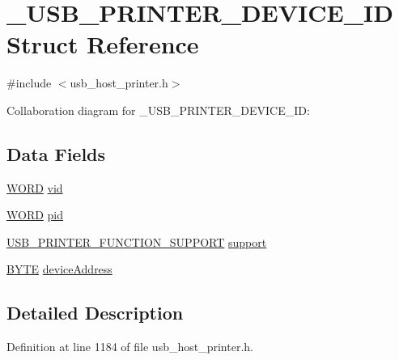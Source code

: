 \hypertarget{struct___u_s_b___p_r_i_n_t_e_r___d_e_v_i_c_e___i_d}{}\section{\+\_\+\+U\+S\+B\+\_\+\+P\+R\+I\+N\+T\+E\+R\+\_\+\+D\+E\+V\+I\+C\+E\+\_\+\+I\+D Struct Reference}
\label{struct___u_s_b___p_r_i_n_t_e_r___d_e_v_i_c_e___i_d}


{\ttfamily \#include $<$usb\+\_\+host\+\_\+printer.\+h$>$}



Collaboration diagram for \+\_\+\+U\+S\+B\+\_\+\+P\+R\+I\+N\+T\+E\+R\+\_\+\+D\+E\+V\+I\+C\+E\+\_\+\+I\+D\+:
\subsection*{Data Fields}
\begin{DoxyCompactItemize}
\item 
\hyperlink{_generic_type_defs_8h_a2b0e863dadf920709ec53d9088ee7c91}{W\+O\+R\+D} \hyperlink{struct___u_s_b___p_r_i_n_t_e_r___d_e_v_i_c_e___i_d_a9fcc011b7b6427b55322964f2d01781f}{vid}
\item 
\hyperlink{_generic_type_defs_8h_a2b0e863dadf920709ec53d9088ee7c91}{W\+O\+R\+D} \hyperlink{struct___u_s_b___p_r_i_n_t_e_r___d_e_v_i_c_e___i_d_a718a3b94d880d84d1532ae6411eb60cc}{pid}
\item 
\hyperlink{union_u_s_b___p_r_i_n_t_e_r___f_u_n_c_t_i_o_n___s_u_p_p_o_r_t}{U\+S\+B\+\_\+\+P\+R\+I\+N\+T\+E\+R\+\_\+\+F\+U\+N\+C\+T\+I\+O\+N\+\_\+\+S\+U\+P\+P\+O\+R\+T} \hyperlink{struct___u_s_b___p_r_i_n_t_e_r___d_e_v_i_c_e___i_d_a608dd933f8c7b8e68ea8eb0d6db48cd0}{support}
\item 
\hyperlink{_generic_type_defs_8h_a4ae1dab0fb4b072a66584546209e7d58}{B\+Y\+T\+E} \hyperlink{struct___u_s_b___p_r_i_n_t_e_r___d_e_v_i_c_e___i_d_aa1d659071a17ee8d0172d34d6783b517}{device\+Address}
\end{DoxyCompactItemize}


\subsection{Detailed Description}


Definition at line 1184 of file usb\+\_\+host\+\_\+printer.\+h.




